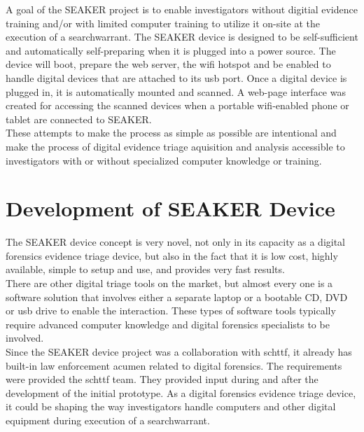\documentclass[12pt]{article}
\begin{document}
A goal of the SEAKER project is to enable investigators without 
digitial evidence training and/or with limited computer training to utilize it
on-site at the execution of a \gls{searchwarrant}.  The SEAKER device is designed to
be self-sufficient and automatically self-preparing when it is plugged into a 
power source.  The device will boot, prepare the web server, the \gls{wifi} hotspot
and be enabled to handle digital devices that are attached to its \gls{usb} port.
Once a digital device is plugged in, it is automatically mounted and scanned.
A web-page interface was created for accessing the scanned devices when a portable
\gls{wifi}-enabled phone or tablet are connected to SEAKER.\\

These attempts to make the process as simple as possible are intentional and 
make the process of digital evidence triage aquisition and analysis
accessible to investigators with or without specialized computer knowledge or
training.\\

\section{Development of SEAKER Device}
\label{sect-developmentSeakerDevice}

The SEAKER device concept is very novel, not only in its capacity as a digital 
forensics evidence triage device, but also in the fact that it is low cost, highly
available, simple to setup and use, and provides very fast results.\\

There are other digital triage tools on the market, but almost every one is a
software solution that involves either a separate laptop or a bootable
CD, DVD or \gls{usb} drive to enable the interaction.  These types of software tools
typically require advanced computer knowledge and digital forensics specialists
to be involved.\\

Since the SEAKER device project was a collaboration with \gls{schttf}, it already has
built-in law enforcement acumen related to digital forensics.  The requirements were
provided the \gls{schttf} team.  They provided input during and after the development
of the initial prototype.  As a digital
forensics evidence triage device, it could be shaping the way investigators
handle computers and other digital equipment during execution of a \gls{searchwarrant}.\\
\end{document}
